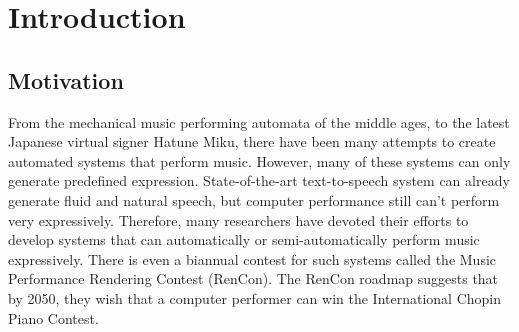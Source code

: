 \chapter{Introduction}
\section{Motivation}
From the mechanical music performing automata of the middle ages, to the latest Japanese virtual signer Hatune Miku, there have been many attempts to create automated systems that perform music. However, many of these systems can only generate predefined expression. State-of-the-art text-to-speech system can already generate fluid and natural speech, but computer performance still can't perform very expressively. Therefore, many researchers have devoted their efforts to develop systems that can automatically or semi-automatically perform music expressively. There is even a biannual contest for such systems called the Music Performance Rendering Contest (RenCon)\cite{RenCon}. The RenCon roadmap suggests that by 2050, they wish that a computer performer can win the International Chopin Piano Contest.


